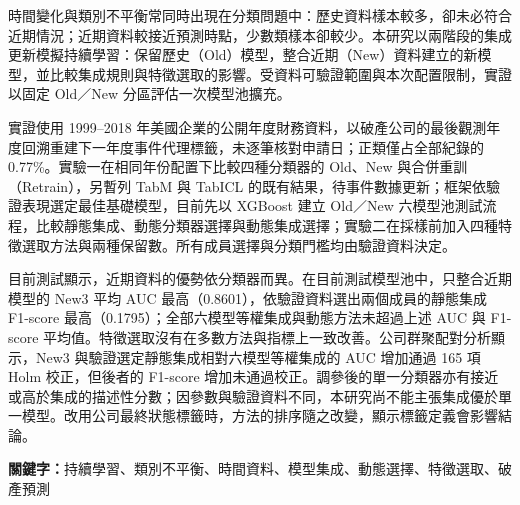 時間變化與類別不平衡常同時出現在分類問題中：歷史資料樣本較多，卻未必符合近期情況；近期資料較接近預測時點，少數類樣本卻較少。本研究以兩階段的集成更新模擬持續學習：保留歷史（Old）模型，整合近期（New）資料建立的新模型，並比較集成規則與特徵選取的影響。受資料可驗證範圍與本次配置限制，實證以固定 Old／New 分區評估一次模型池擴充。

實證使用 1999--2018 年美國企業的公開年度財務資料，以破產公司的最後觀測年度回溯重建下一年度事件代理標籤，未逐筆核對申請日；正類僅占全部紀錄的 0.77\%。實驗一在相同年份配置下比較四種分類器的 Old、New 與合併重訓（Retrain），另暫列 TabM 與 TabICL 的既有結果，待事件數據更新；框架依驗證表現選定最佳基礎模型，目前先以 XGBoost 建立 Old／New 六模型池測試流程，比較靜態集成、動態分類器選擇與動態集成選擇；實驗二在採樣前加入四種特徵選取方法與兩種保留數。所有成員選擇與分類門檻均由驗證資料決定。

目前測試顯示，近期資料的優勢依分類器而異。在目前測試模型池中，只整合近期模型的 New3 平均 AUC 最高（0.8601），依驗證資料選出兩個成員的靜態集成 F1-score 最高（0.1795）；全部六模型等權集成與動態方法未超過上述 AUC 與 F1-score 平均值。特徵選取沒有在多數方法與指標上一致改善。公司群聚配對分析顯示，New3 與驗證選定靜態集成相對六模型等權集成的 AUC 增加通過 165 項 Holm 校正，但後者的 F1-score 增加未通過校正。調參後的單一分類器亦有接近或高於集成的描述性分數；因參數與驗證資料不同，本研究尚不能主張集成優於單一模型。改用公司最終狀態標籤時，方法的排序隨之改變，顯示標籤定義會影響結論。

\noindent\textbf{關鍵字：}持續學習、類別不平衡、時間資料、模型集成、動態選擇、特徵選取、破產預測
